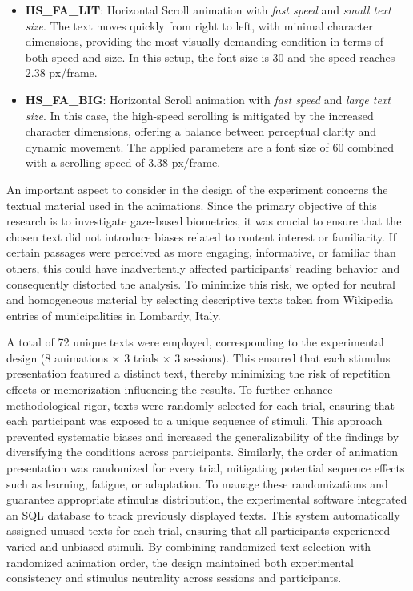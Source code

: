 \documentclass{article}
\begin{document}
\begin{itemize}
    \item \textbf{HS\_FA\_LIT}: Horizontal Scroll animation with \emph{fast speed} and \emph{small text size}. 
    The text moves quickly from right to left, with minimal character dimensions, providing the most visually demanding condition in terms of both speed and size. 
    In this setup, the font size is 30 and the speed reaches 2.38 px/frame. 

    \item \textbf{HS\_FA\_BIG}: Horizontal Scroll animation with \emph{fast speed} and \emph{large text size}. 
    In this case, the high-speed scrolling is mitigated by the increased character dimensions, offering a balance between perceptual clarity and dynamic movement.  
    The applied parameters are a font size of 60 combined with a scrolling speed of 3.38 px/frame.
\end{itemize}

An important aspect to consider in the design of the experiment concerns the textual material used in the animations. 
Since the primary objective of this research is to investigate gaze-based biometrics, it was crucial to ensure that the chosen text did not introduce biases related to content interest or familiarity. 
If certain passages were perceived as more engaging, informative, or familiar than others, this could have inadvertently affected participants' reading behavior and consequently distorted the analysis. 
To minimize this risk, we opted for neutral and homogeneous material by selecting descriptive texts taken from Wikipedia entries of municipalities in Lombardy, Italy.

A total of 72 unique texts were employed, corresponding to the experimental design (8 animations × 3 trials × 3 sessions). 
This ensured that each stimulus presentation featured a distinct text, thereby minimizing the risk of repetition effects or memorization influencing the results.
To further enhance methodological rigor, texts were randomly selected for each trial, ensuring that each participant was exposed to a unique sequence of stimuli. 
This approach prevented systematic biases and increased the generalizability of the findings by diversifying the conditions across participants.
Similarly, the order of animation presentation was randomized for every trial, mitigating potential sequence effects such as learning, fatigue, or adaptation.
To manage these randomizations and guarantee appropriate stimulus distribution, the experimental software integrated an SQL database to track previously displayed texts. 
This system automatically assigned unused texts for each trial, ensuring that all participants experienced varied and unbiased stimuli. 
By combining randomized text selection with randomized animation order, the design maintained both experimental consistency and stimulus neutrality across sessions and participants.
\end{document}

